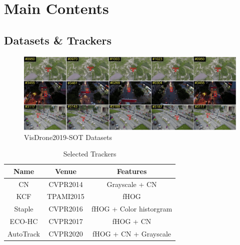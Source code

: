 \documentclass{beamer}
\begin{document}
\section{Main Contents}

\subsection{Datasets \& Trackers}

\begin{frame}
    \begin{figure}[htpb]
        \begin{center}
            \includegraphics[width=1.0\linewidth]{fig/VisDrone.png}
            \caption{VisDrone2019-SOT Datasets}
        \end{center}
    \end{figure}
\end{frame}

\begin{frame}
    \begin{table}[htpb]
        \centering
        \caption{Selected Trackers}
        \label{tab:number}
        \begin{tabular}{ccc}\toprule
            Name      & Venue     & Features                \\\midrule
            CN        & CVPR2014  & Grayscale + CN          \\
            KCF       & TPAMI2015 & fHOG                    \\
            Staple    & CVPR2016  & fHOG + Color historgram \\
            ECO-HC    & CVPR2017  & fHOG + CN               \\
            AutoTrack & CVPR2020  & fHOG + CN + Grayscale   \\\bottomrule
        \end{tabular}
    \end{table}
\end{frame}
\end{document}

